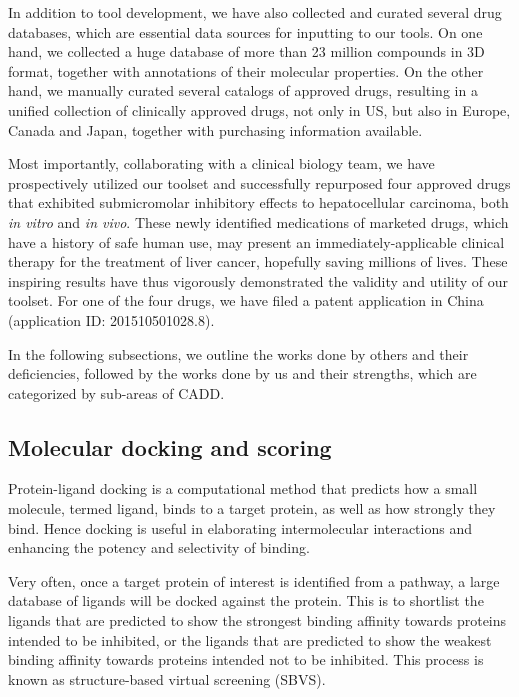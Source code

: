 \documentclass[a4paper,12pt]{article}
\begin{document}
In addition to tool development, we have also collected and curated several drug databases, which are essential data sources for inputting to our tools. On one hand, we collected a huge database of more than 23 million compounds in 3D format, together with annotations of their molecular properties. On the other hand, we manually curated several catalogs of approved drugs, resulting in a unified collection of clinically approved drugs, not only in US, but also in Europe, Canada and Japan, together with purchasing information available.

Most importantly, collaborating with a clinical biology team, we have prospectively utilized our toolset and successfully repurposed four approved drugs that exhibited submicromolar inhibitory effects to hepatocellular carcinoma, both \textit{in vitro} and \textit{in vivo}. These newly identified medications of marketed drugs, which have a history of safe human use, may present an immediately-applicable clinical therapy for the treatment of liver cancer, hopefully saving millions of lives. These inspiring results have thus vigorously demonstrated the validity and utility of our toolset. For one of the four drugs, we have filed a patent application in China (application ID: 201510501028.8).

In the following subsections, we outline the works done by others and their deficiencies, followed by the works done by us and their strengths, which are categorized by sub-areas of CADD.

\subsection*{Molecular docking and scoring}

Protein-ligand docking is a computational method that predicts how a small molecule, termed ligand, binds to a target protein, as well as how strongly they bind. Hence docking is useful in elaborating intermolecular interactions and enhancing the potency and selectivity of binding.

Very often, once a target protein of interest is identified from a pathway, a large database of ligands will be docked against the protein. This is to shortlist the ligands that are predicted to show the strongest binding affinity towards proteins intended to be inhibited, or the ligands that are predicted to show the weakest binding affinity towards proteins intended not to be inhibited. This process is known as structure-based virtual screening (SBVS).
\end{document}
